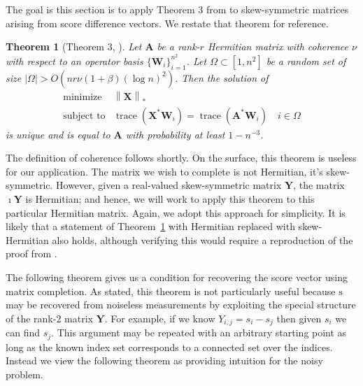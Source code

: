 \documentclass{sig-alternate}
\newtheorem{theorem}{Theorem}
\DeclareMathOperator{\tr}{trace}
\newcommand{\mat}{\boldsymbol}
\renewcommand{\vec}[1]{\boldsymbol{\mathrm{#1}}}
\providecommand{\mA}{\ensuremath{\mat{A}}}
\providecommand{\mW}{\ensuremath{\mat{W}}}
\providecommand{\mX}{\ensuremath{\mat{X}}}
\providecommand{\mY}{\ensuremath{\mat{Y}}}
\providecommand{\vs}{\ensuremath{\vec{s}}}
\DeclareMathOperator*{\minimize}{minimize}
\DeclareMathOperator{\subjectto}{subject\ to}
\providecommand{\MINof}[1][]{{\displaystyle \minimize_{#1}}}
\providecommand{\MINone}[3]{\begin{array}{ll} \MINof[#1] & #2 \\ \subjectto  & #3 \end{array}}
\newcommand{\sstretchsym}[3]{\ensuremath{\left#1 #3 \right#2}}
\newcommand{\normof}[2][]{\sstretchsym{\|}{\|}{#2}_{#1}}
\begin{document}
The goal is this section is to apply Theorem 3 from \citet{Gross2010-low-rank}
to skew-symmetric matrices arising from score difference vectors.  We restate
that theorem for reference.
\begin{theorem}[Theorem 3, \citet{Gross2010-low-rank}]
\label{thm:recovery}
Let $\mA$ be a rank-$r$ Hermitian matrix with coherence $\nu$ with respect to an 
operator basis $\{\mW_i\}_{i=1}^{n^2}$.  Let $\Omega \subset [1, n^2]$
be a random set of size $|\Omega| > O(nr\nu(1+\beta)(\log n)^2)$. 
Then the solution of 
\[ \MINone{}{ \normof[*]{\mX} }{ \tr(\mX^* \mW_i) = \tr(\mA^* \mW_i) \quad i \in \Omega} \]
is unique and is equal to $\mA$ with probability at least $1 - n^{-3}$.
\end{theorem}
The definition of coherence follows shortly.  On the surface,
this theorem is useless for our application.  The matrix we wish
to complete is not Hermitian, it's skew-symmetric.  
However, given a real-valued
skew-symmetric matrix $\mY$, the matrix $\imath \mY$ is Hermitian;
and hence, we will work to apply this theorem to this 
particular Hermitian matrix.
Again, we adopt this approach for simplicity.  It is likely
that a statement of Theorem~\ref{thm:recovery} 
with Hermitian replaced with
skew-Hermitian also holds, although verifying this would
require a reproduction of the proof from \citet{Gross2010-low-rank}.
 
The following theorem gives us a condition
for recovering the score vector using matrix completion.
As stated, this theorem is not particularly useful 
because $\vs$ may be recovered from noiseless measurements
by exploiting the special structure of the rank-2
matrix $\mY$.  For example, if we know $Y_{i,j} = s_i - s_j$ 
then given $s_i$ we can find $s_j$.  This argument may
be repeated with an arbitrary starting point as long 
as the known index set corresponds to a connected set
over the indices.  
Instead we view the following theorem as
providing intuition for the noisy problem.  
\end{document}
